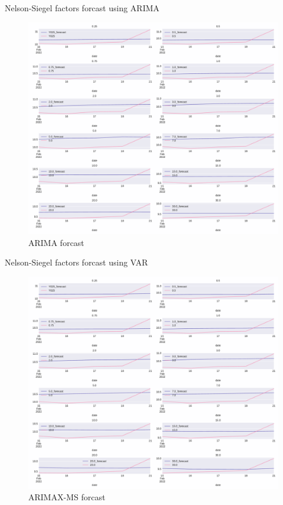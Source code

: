 \documentclass[aspectratio=169]{beamer}
\begin{document}
    \begin{frame}{Nelson-Siegel factors forcast using ARIMA}
        \begin{figure}
            \includegraphics[scale=0.22]{fig/ARIMAfcst copy.pdf}
            \caption{ARIMA forcast}
            \label{fig:VARnsfcst}
        \end{figure}
    \end{frame}


    \begin{frame}{Nelson-Siegel factors forcast using VAR}
        \begin{figure}
            \includegraphics[scale=0.22]{fig/ARIMAX_MSFRCST.pdf}
            \caption{ARIMAX-MS forcast}
            \label{fig:VARnsfcst}
        \end{figure}
    \end{frame}
\end{document}
